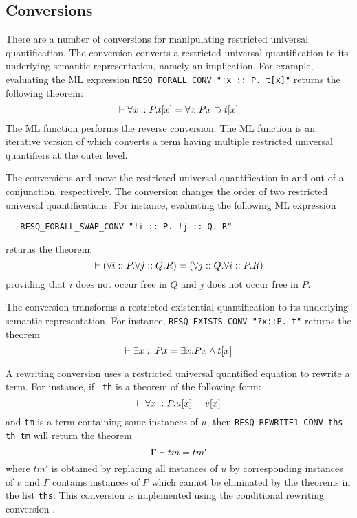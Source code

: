 \subsection{Conversions}

There are a number of conversions for manipulating restricted
universal quantification. The conversion 
converts a restricted universal quantification to its underlying
semantic representation, namely an implication. For example,
evaluating the ML expression
\verb|RESQ_FORALL_CONV "!x :: P. t[x]"| returns the following theorem:
\[
\THM \forall x :: P. t[x] = \forall x. P x \IMP t[x]
\]
The ML function
 performs the reverse conversion. The ML
function  is an iterative version of
 which converts a term having multiple
restricted universal quantifiers at the outer level.

The conversions  and
 move the restricted universal
quantification in and out of a conjunction, respectively.
The conversion \linebreak{} changes the order of two
restricted universal quantifications. For instance, evaluating the
following ML expression
\begin{verbatim}
   RESQ_FORALL_SWAP_CONV "!i :: P. !j :: Q. R"
\end{verbatim}
returns the theorem:
\[
\THM (\forall i :: P. \forall j :: Q. R) = (\forall j :: Q. \forall i :: P. R)
\]
providing that $i$ does not occur free in $Q$ and $j$ does not occur
free in $P$.

The conversion  transforms a restricted
existential quantification to its underlying semantic representation.
For instance, \verb|RESQ_EXISTS_CONV "?x::P. t"| returns the theorem
\[
\THM \exists x::P. t = \exists x. P x \AND t[x]
\]

A rewriting conversion  uses a restricted
universal quantified equation to rewrite a term. For instance, if {\tt
th} is a theorem of the following form:
\[
\THM \forall x::P. u[x] = v[x]
\]
and {\tt tm} is a term containing some instances of $u$,
then \verb|RESQ_REWRITE1_CONV ths th tm| will return the theorem
\[
\Gamma \THM tm = tm'
\]
where $tm'$ is obtained by replacing all instances of $u$ by
corresponding instances of $v$ and $\Gamma$ contains instances of $P$
which cannot be eliminated by the theorems in the list {\tt ths}. This
conversion is implemented using the conditional rewriting conversion
.

